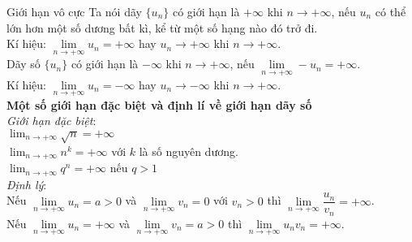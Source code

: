 \begin{dang}{Giới hạn vô cực}
	Ta nói dãy $\{u_n\}$ có giới hạn là $+ \infty$ khi $n \rightarrow + \infty$, nếu $u_n$ có thể lớn hơn một số dương bất kì, kể từ một số hạng nào đó trở đi. \\
	Kí hiệu: $\lim \limits_{n \to +\infty}u_n = + \infty$ hay $u_n \rightarrow + \infty$ khi $n \rightarrow + \infty$. \\ 
	Dãy số $\{u_n\}$ có giới hạn là $- \infty$ khi $n \rightarrow + \infty$, nếu $\lim \limits_{n \to +\infty}- u_n = + \infty$. \\
	Kí hiệu: $\lim \limits_{n \to +\infty}u_n = - \infty$ hay $u_n \rightarrow - \infty$ khi $n \rightarrow + \infty$. \\ 
	\textbf{Một số giới hạn đặc biệt và định lí về giới hạn dãy số} \\
	\textit{Giới hạn đặc biệt}: \\
	$\displaystyle \lim_{n \rightarrow + \infty} \sqrt{n} = + \infty$ \\
	$\displaystyle \lim_{n \rightarrow + \infty} n^k = + \infty$ với $k$ là số nguyên dương. \\
	$\displaystyle \lim_{n \rightarrow + \infty} q^n = + \infty$ nếu $q > 1$ \\
	\textit{Định lý}: \\
	Nếu $\lim \limits_{n \to +\infty}u_n = a > 0$ và $\lim \limits_{n \to +\infty}v_n = 0$ với $v_n > 0$ thì $\lim \limits_{n \to +\infty}\dfrac{u_n}{v_n} = + \infty$. \\
	Nếu $\lim \limits_{n \to +\infty}u_n = + \infty$ và $\lim \limits_{n \to +\infty}v_n = a > 0$ thì $\lim \limits_{n \to +\infty}u_nv_n = + \infty$.
\end{dang}
